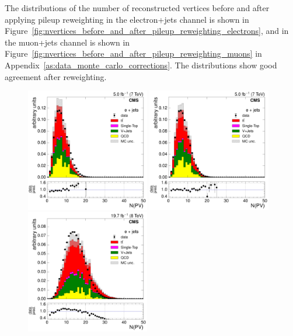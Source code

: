 The distributions of the number of reconstructed vertices before and after applying pileup reweighting in the
electron+jets channel is shown in Figure~\ref{fig:nvertices_before_and_after_pileup_reweighting_electrons},
and in the muon+jets channel is shown in Figure~\ref{fig:nvertices_before_and_after_pileup_reweighting_muons}
in Appendix~\ref{as:data_monte_carlo_corrections}. The distributions show good agreement after reweighting.

\begin{figure}[hbtp]
    \centering
      \includegraphics[width=0.48\textwidth]{Chapters/07_08_09_Analysis/Images/control_plots/before_fit/7TeV/EPlusJets_nVertex_with_ratio}\hfill
      \includegraphics[width=0.48\textwidth]{Chapters/07_08_09_Analysis/Images/control_plots/before_fit/7TeV/EPlusJets_nVertex_reweighted_with_ratio}\\
      \includegraphics[width=0.48\textwidth]{Chapters/07_08_09_Analysis/Images/control_plots/before_fit/8TeV/EPlusJets_nVertex_with_ratio}\hfill

\end{figure}
